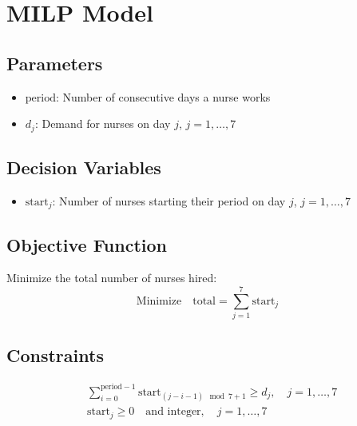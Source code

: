 \documentclass{article}
\begin{document}
\section*{MILP Model}

\subsection*{Parameters}
\begin{itemize}
    \item $\text{period}$: Number of consecutive days a nurse works
    \item $d_j$: Demand for nurses on day $j$, $j = 1, \ldots, 7$
\end{itemize}

\subsection*{Decision Variables}
\begin{itemize}
    \item $\text{start}_j$: Number of nurses starting their period on day $j$, $j = 1, \ldots, 7$
\end{itemize}

\subsection*{Objective Function}
Minimize the total number of nurses hired:
\[
\text{Minimize} \quad \text{total} = \sum_{j=1}^{7} \text{start}_j
\]

\subsection*{Constraints}
\begin{align}
    & \sum_{i=0}^{\text{period}-1} \text{start}_{(j-i-1) \mod 7 + 1} \geq d_j, \quad j = 1, \ldots, 7 \\
    & \text{start}_j \geq 0 \quad \text{and integer}, \quad j = 1, \ldots, 7
\end{align}
\end{document}
